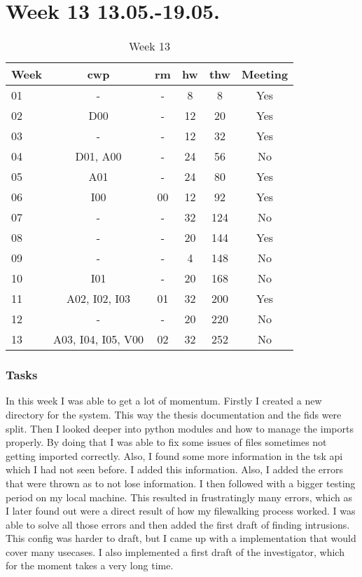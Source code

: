 \section{Week 13 13.05.-19.05.}
\label{sec:journal:week13}

\begin{table}[!ht]
    \begin{center}
        \caption{Week 13}
        \label{tab:journal:week13}
        \begin{tabular}{l|c|c|c|c|c}
            \textbf{Week} & \textbf{\gls{cwp}} & \textbf{\gls{rm}} & \textbf{\gls{hw}} & \textbf{\gls{thw}} & \textbf{Meeting}\\
        \hline
        01 & - & - & 8 & 8 & Yes \\
        02 & D00 & - & 12 & 20 & Yes \\
        03 & - & - & 12 & 32 & Yes \\
        04 & D01, A00 & - & 24 & 56 & No \\
        05 & A01 & - & 24 & 80 & Yes \\
        06 & I00 & 00 & 12 & 92 & Yes \\
        07 & - & - & 32 & 124 & No \\
        08 & - & - & 20 & 144 & Yes \\
        09 & - & - & 4 & 148 & No \\
        10 & I01 & - & 20 & 168 & No \\
        11 & A02, I02, I03 & 01 & 32 & 200 & Yes \\
        12 & - & - & 20 & 220 & No \\
        13 & A03, I04, I05, V00 & 02 & 32 & 252 & No \\
        \end{tabular}
    \end{center}
\end{table}

\subsubsection{Tasks}

In this week I was able to get a lot of momentum. Firstly I created a new directory for the system. This way the thesis documentation and the \gls{fids} were split. Then I looked deeper into python modules and how to manage the imports properly. By doing that I was able to fix some issues of files sometimes not getting imported correctly. Also, I found some more information in the \gls{tsk} \gls{api} which I had not seen before. I added this information. Also, I added the errors that were thrown as to not lose information. I then followed with a bigger testing period on my local machine. This resulted in frustratingly many errors, which as I later found out were a direct result of how my filewalking process worked. I was able to solve all those errors and then added the first draft of finding intrusions. This config was harder to draft, but I came up with a implementation that would cover many usecases. I also implemented a first draft of the investigator, which for the moment takes a very long time.

